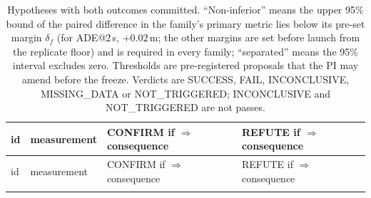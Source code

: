 \begingroup\footnotesize\setlength{\tabcolsep}{4pt}\setlength{\LTcapwidth}{\textwidth}
\begin{longtable}{@{}p{1.3cm}p{3.8cm}p{5.3cm}p{4.9cm}@{}}
\caption{Hypotheses with both outcomes committed. ``Non-inferior'' means the upper 95\% bound of the paired difference in the family's primary metric lies below its pre-set margin $\delta_f$ (for ADE@2\,s, $+0.02$\,m; the other margins are set before launch from the replicate floor) and is required in every family; ``separated'' means the 95\% interval excludes zero. Thresholds are pre-registered proposals that the PI may amend before the freeze. Verdicts are SUCCESS, FAIL, INCONCLUSIVE, MISSING\_DATA or NOT\_TRIGGERED; INCONCLUSIVE and NOT\_TRIGGERED are not passes.}\label{tab:hyp}\\
\toprule
id & measurement & CONFIRM if $\Rightarrow$ consequence & REFUTE if $\Rightarrow$ consequence \\ \midrule
\endfirsthead
\toprule
id & measurement & CONFIRM if $\Rightarrow$ consequence & REFUTE if $\Rightarrow$ consequence \\ \midrule
\endhead
\bottomrule
\endfoot


\end{longtable}
